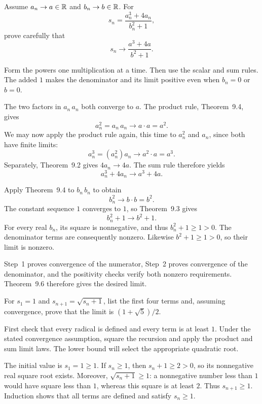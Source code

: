 
\goal Assume $a_n\to a\in\mathbb{R}$ and $b_n\to b\in\mathbb{R}$. For
\[
 s_n=\frac{a_n^3+4a_n}{b_n^2+1},
\]
prove carefully that
\[
 s_n\longrightarrow\frac{a^3+4a}{b^2+1}.
\]

\idea Form the powers one multiplication at a time. Then use the
scalar and sum rules. The added $1$ makes the denominator and its
limit positive even when $b_n=0$ or $b=0$.

The two factors in $a_n\,a_n$ both converge to $a$.
The product rule, Theorem~9.4, gives
\[
 a_n^2=a_n\,a_n\longrightarrow a\cdot a=a^2.
\]
We may now apply the product rule again, this time to $a_n^2$ and
$a_n$, since both have finite limits:
\[
 a_n^3=(a_n^2)a_n\longrightarrow a^2\cdot a=a^3.
\]
Separately, Theorem~9.2 gives $4a_n\to4a$.
The sum rule therefore yields
\[
 a_n^3+4a_n\longrightarrow a^3+4a.
\]

Apply Theorem~9.4 to $b_n\,b_n$ to obtain
\[
 b_n^2\longrightarrow b\cdot b=b^2.
\]
The constant sequence $1$ converges to $1$, so Theorem~9.3 gives
\[
 b_n^2+1\longrightarrow b^2+1.
\]
For every real $b_n$, its square is nonnegative, and thus
$b_n^2+1\ge1>0$. The denominator terms are consequently nonzero.
Likewise $b^2+1\ge1>0$, so their limit is nonzero.

Step~1 proves convergence of the numerator, Step~2 proves convergence
of the denominator, and the positivity checks verify both nonzero
requirements. Theorem~9.6 therefore gives the desired limit.


\goal For $s_1=1$ and $s_{n+1}=\sqrt{s_n+1}$, list the first
four terms and, assuming convergence, prove that the limit is
$(1+\sqrt5)/2$.

\idea First check that every radical is defined and every term is
at least $1$. Under the stated convergence assumption, square the
recursion and apply the product and sum limit laws. The lower bound
will select the appropriate quadratic root.

The initial value is $s_1=1\ge1$. If $s_n\ge1$, then
$s_n+1\ge2>0$, so its nonnegative real square root exists.
Moreover, $\sqrt{s_n+1}\ge1$: a nonnegative number less than $1$
would have square less than $1$, whereas this square is at least $2$.
Thus $s_{n+1}\ge1$. Induction shows that all terms are defined
and satisfy $s_n\ge1$.

